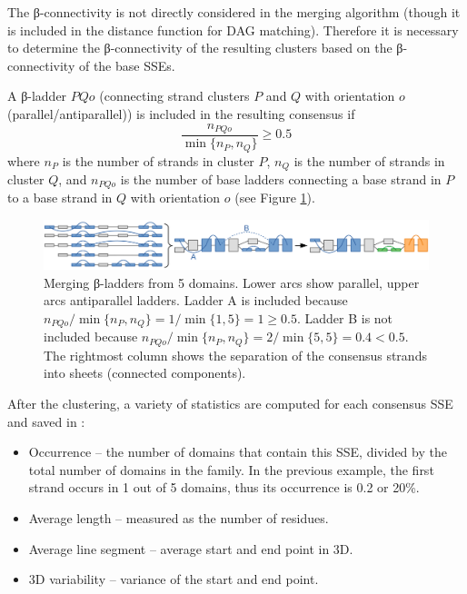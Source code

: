 \documentclass{article}
\begin{document}
The β-connectivity is not directly considered in the merging algorithm 
(though it is included in the distance function for DAG matching).
Therefore it is necessary to determine the β-connectivity of the resulting clusters 
based on the β-connectivity of the base SSEs.

A β-ladder \(PQo\) (connecting strand clusters \(P\) and \(Q\) with orientation \(o\) (parallel/antiparallel)) 
is included in the resulting consensus if
  \[  \frac { n_{PQo} } { \min{\{n_P, n_Q\}} } \geq 0.5  \]
where \(n_P\) is the number of strands in cluster \(P\), 
\(n_Q\) is the number of strands in cluster \(Q\),
and \(n_{PQo}\) is the number of base ladders connecting a base strand in \(P\) to a base strand in \(Q\)
with orientation \(o\) (see Figure \ref{fig:dag_ladders}).

\begin{figure}[h!]
  \centering\includegraphics[width=\linewidth]{figures/dag_ladders.png}
  \caption{Merging β-ladders from 5 domains. 
  Lower arcs show parallel, upper arcs antiparallel ladders.
  Ladder A is included because \( n_{PQo} / \min{\{n_P, n_Q\}} = 1 / \min{\{1, 5\}} = 1 \geq 0.5\).
  Ladder B is not included because \( n_{PQo} / \min{\{n_P, n_Q\}} = 2 / \min{\{5, 5\}} = 0.4 < 0.5\).
  The rightmost column shows the separation of the consensus strands into sheets (connected components).}
  \label{fig:dag_ladders}
\end{figure}

After the clustering, a variety of statistics are computed for each consensus SSE and saved in : 
\begin{itemize}
  \item
    Occurrence -- the number of domains that contain this SSE, 
    divided by the total number of domains in the family. 
    In the previous example, the first strand occurs in 1 out of 5 domains, 
    thus its occurrence is 0.2 or 20\%.
  \item
    Average length -- measured as the number of residues.
  \item
    Average line segment -- average start and end point in 3D.
  \item
    3D variability -- variance of the start and end point.
\end{itemize}
\end{document}
